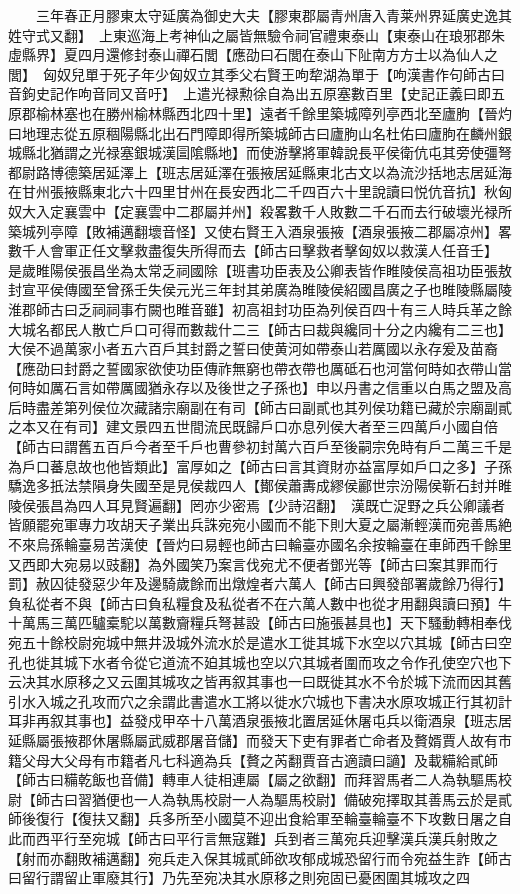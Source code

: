 　　三年春正月膠東太守延廣為御史大夫【膠東郡屬青州唐入青莱州界延廣史逸其姓守式又翻】　上東巡海上考神仙之屬皆無驗令祠官禮東泰山【東泰山在琅邪郡朱虛縣界】夏四月還修封泰山禪石閭【應劭曰石閭在泰山下阯南方方士以為仙人之閭】　匈奴兒單于死子年少匈奴立其季父右賢王呴犂湖為單于【呴漢書作句師古曰音鉤史記作呴音同又音吁】　上遣光禄勲徐自為出五原塞數百里【史記正義曰即五原郡榆林塞也在勝州榆林縣西北四十里】遠者千餘里築城障列亭西北至廬朐【晉灼曰地理志從五原稒陽縣北出石門障即得所築城師古曰廬朐山名杜佑曰廬朐在麟州銀城縣北猶謂之光禄塞銀城漢圁隂縣地】而使游擊將軍韓說長平侯衛伉屯其旁使彊弩都尉路博德築居延澤上【班志居延澤在張掖居延縣東北古文以為流沙括地志居延海在甘州張掖縣東北六十四里甘州在長安西北二千四百六十里說讀曰悦伉音抗】秋匈奴大入定襄雲中【定襄雲中二郡屬并州】殺畧數千人敗數二千石而去行破壞光禄所築城列亭障【敗補邁翻壞音怪】又使右賢王入酒泉張掖【酒泉張掖二郡屬凉州】畧數千人會軍正任文擊救盡復失所得而去【師古曰擊救者擊匈奴以救漢人任音壬】　是歲睢陽侯張昌坐為太常乏祠國除【班書功臣表及公卿表皆作睢陵侯高祖功臣張敖封宣平侯傳國至曾孫壬失侯元光三年封其弟廣為睢陵侯紹國昌廣之子也睢陵縣屬陵淮郡師古曰乏祠祠事冇闕也睢音雖】初高祖封功臣為列侯百四十有三人時兵革之餘大城名都民人散亡戶口可得而數裁什二三【師古曰裁與纔同十分之内纔有二三也】大侯不過萬家小者五六百戶其封爵之誓曰使黄河如帶泰山若厲國以永存爰及苗裔【應劭曰封爵之誓國家欲使功臣傳祚無窮也帶衣帶也厲砥石也河當何時如衣帶山當何時如厲石言如帶厲國猶永存以及後世之子孫也】申以丹書之信重以白馬之盟及高后時盡差第列侯位次藏諸宗廟副在有司【師古曰副貳也其列侯功籍已藏於宗廟副貳之本又在有司】建文景四五世間流民既歸戶口亦息列侯大者至三四萬戶小國自倍【師古曰謂舊五百戶今者至千戶也曹參初封萬六百戶至後嗣宗免時有戶二萬三千是為戶口蕃息故也他皆類此】富厚如之【師古曰言其資財亦益富厚如戶口之多】子孫驕逸多扺法禁隕身失國至是見侯裁四人【鄼侯蕭夀成繆侯酈世宗汾陽侯靳石封并睢陵侯張昌為四人耳見賢遍翻】罔亦少密焉【少詩沼翻】　漢既亡浞野之兵公卿議者皆願罷宛軍專力攻胡天子業出兵誅宛宛小國而不能下則大夏之屬漸輕漢而宛善馬絶不來烏孫輪臺易苦漢使【晉灼曰易輕也師古曰輪臺亦國名余按輪臺在車師西千餘里又西即大宛易以豉翻】為外國笑乃案言伐宛尤不便者鄧光等【師古曰案其罪而行罰】赦囚徒發惡少年及邊騎歲餘而出燉煌者六萬人【師古曰興發部署歲餘乃得行】負私從者不與【師古曰負私糧食及私從者不在六萬人數中也從才用翻與讀曰預】牛十萬馬三萬匹驢槖駝以萬數齎糧兵弩甚設【師古曰施張甚具也】天下騷動轉相奉伐宛五十餘校尉宛城中無井汲城外流水於是遣水工徙其城下水空以穴其城【師古曰空孔也徙其城下水者令從它道流不廹其城也空以穴其城者圍而攻之令作孔使空穴也下云决其水原移之又云圍其城攻之皆再叙其事也一曰既徙其水不令於城下流而因其舊引水入城之孔攻而穴之余謂此書遣水工將以徙水穴城也下書决水原攻城正行其初計耳非再叙其事也】益發戍甲卒十八萬酒泉張掖北置居延休屠屯兵以衛酒泉【班志居延縣屬張掖郡休屠縣屬武威郡屠音儲】而發天下吏有罪者亡命者及贅婿賈人故有市籍父母大父母有市籍者凡七科適為兵【贅之芮翻賈音古適讀曰讁】及載糒給貳師【師古曰糒乾飯也音備】轉車人徒相連屬【屬之欲翻】而拜習馬者二人為執驅馬校尉【師古曰習猶便也一人為執馬校尉一人為驅馬校尉】備破宛擇取其善馬云於是貳師後復行【復扶又翻】兵多所至小國莫不迎出食給軍至輪臺輪臺不下攻數日屠之自此而西平行至宛城【師古曰平行言無寇難】兵到者三萬宛兵迎擊漢兵漢兵射敗之【射而亦翻敗補邁翻】宛兵走入保其城貳師欲攻郁成城恐留行而令宛益生詐【師古曰留行謂留止軍廢其行】乃先至宛决其水原移之則宛固已憂困圍其城攻之四